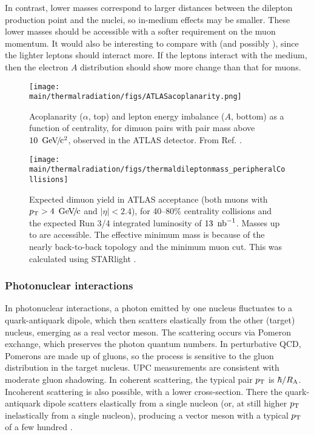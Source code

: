 \documentclass[../report.tex]{subfiles}
\providecommand{\main}{..}
\begin{document}
In contrast, lower masses correspond to larger distances between the dilepton production point and the nuclei, so in-medium effects may be smaller.  These lower masses should be accessible with a softer requirement on the muon momentum.   It would also be interesting to compare \Pepem with \PGmpGmm (and possibly \PGtp\PGtm), since the lighter leptons should interact more.  If the leptons interact with the medium, then the electron $A$ distribution should show more change than that for muons.  

\begin{figure}[htb]
\centering
\texttt{[image: \\main/thermalradiation/figs/ATLASacoplanarity.png]}
\caption{Acoplanarity ($\alpha$, top) and lepton energy imbalance ($A$, bottom) as a function of centrality, for dimuon pairs with pair mass above $\unit[10]{\UGeVcc}$, observed in the ATLAS detector.  From Ref. \cite{Aaboud:2018eph}.}
\label{fig:ATLASacoplanarity}
\end{figure}

\begin{figure}[htb]
\centering
\texttt{[image: \\main/thermalradiation/figs/thermaldileptonmass\_peripheralCollisions]}
\caption{Expected dimuon yield in ATLAS acceptance (both muons with $\pT>\unit[4]{\UGeVc}$ and $|\eta|<2.4$), for 40--80\% centrality \PbPb{} collisions and the expected Run 3/4 integrated luminosity of $\unit[13]{\Unb^{-1}}$.  Masses up to \unit[100]{\UGeVcc} are accessible.  The effective \unit[8]{\UGeVcc} minimum mass is because of the nearly back-to-back topology and the \unit[4]{\UGeVc} minimum muon \pT{} cut. This was calculated using STARlight \cite{Klein:2016yzr,Klein:2018cjh}.
}
\label{fig:project} 
\end{figure}


\subsubsection{Photonuclear interactions}

In photonuclear interactions, a photon emitted by one nucleus fluctuates to a quark-antiquark dipole, which then scatters elastically from the other (target) nucleus, emerging as a real vector meson.  The scattering occurs via Pomeron exchange, which preserves the photon quantum numbers.  In perturbative QCD, Pomerons are made up of gluons, so the process is sensitive to the gluon distribution in the target nucleus.  UPC measurements are consistent with moderate gluon shadowing.   In coherent scattering, the typical pair $p\sb{\scriptstyle\mathrm{T}}$ is $\hbar/R_{\rm A}$.  Incoherent scattering is also possible, with a lower cross-section.  There the quark-antiquark dipole scatters elastically from a single nucleon (or, at still higher $p\sb{\scriptstyle\mathrm{T}}$ inelastically from a single nucleon), producing a vector meson with a typical $p\sb{\scriptstyle\mathrm{T}}$ of a few hundred \unit[]{\UMeVc}.
\end{document}
